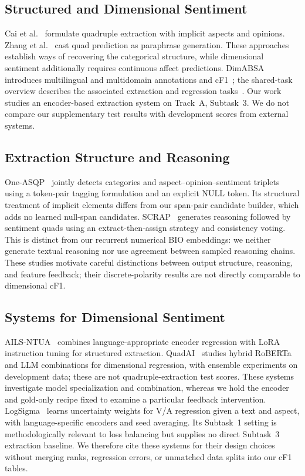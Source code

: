 \documentclass[conference]{IEEEtran}
\begin{document}
\subsection{Structured and Dimensional Sentiment}
Cai et al.~\cite{cai2021acos} formulate quadruple extraction with implicit aspects and opinions. Zhang et al.~\cite{zhang2021asqp} cast quad prediction as paraphrase generation. These approaches establish ways of recovering the categorical structure, while dimensional sentiment additionally requires continuous affect predictions. DimABSA introduces multilingual and multidomain annotations and cF1~\cite{dimabsa2026}; the shared-task overview describes the associated extraction and regression tasks~\cite{overview2026}. Our work studies an encoder-based extraction system on Track~A, Subtask~3. We do not compare our supplementary test results with development scores from external systems.

\subsection{Extraction Structure and Reasoning}
One-ASQP~\cite{zhou2023one} jointly detects categories and aspect--opinion--sentiment triplets using a token-pair tagging formulation and an explicit NULL token. Its structural treatment of implicit elements differs from our span-pair candidate builder, which adds no learned null-span candidates. SCRAP~\cite{kim2024scrap} generates reasoning followed by sentiment quads using an extract-then-assign strategy and consistency voting. This is distinct from our recurrent numerical BIO embeddings: we neither generate textual reasoning nor use agreement between sampled reasoning chains. These studies motivate careful distinctions between output structure, reasoning, and feature feedback; their discrete-polarity results are not directly comparable to dimensional cF1.

\subsection{Systems for Dimensional Sentiment}
AILS-NTUA~\cite{gazetas2026ails} combines language-appropriate encoder regression with LoRA instruction tuning for structured extraction. QuadAI~\cite{devink2026quad} studies hybrid RoBERTa and LLM combinations for dimensional regression, with ensemble experiments on development data; these are not quadruple-extraction test scores. These systems investigate model specialization and combination, whereas we hold the encoder and gold-only recipe fixed to examine a particular feedback intervention. LogSigma~\cite{hikal2026logsigma} learns uncertainty weights for V/A regression given a text and aspect, with language-specific encoders and seed averaging. Its Subtask~1 setting is methodologically relevant to loss balancing but supplies no direct Subtask~3 extraction baseline. We therefore cite these systems for their design choices without merging ranks, regression errors, or unmatched data splits into our cF1 tables.
\end{document}
